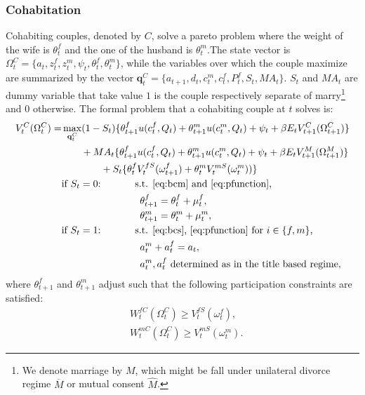 \documentclass[12pt]{article}
\numberwithin{table}{section}
\begin{document}
\subsubsection*{Cohabitation}
Cohabiting couples, denoted by $C$, solve a pareto problem where the weight of the wife is $\theta^f_t$ and the one of the husband is $\theta^m_t$.The state vector is $\Omega^{C}_t=\{a_t,z^f_t,z^m_t,\psi_t,\theta^f_t,\theta^m_t\}$, while the variables over which the couple maximize are summarized by the vector $\mathbf{q}^C_t=\{a_{t+1},d_t,c^m_t,c^f_t,P^f_t,S_t,MA_t\}$. $S_t$ and ${MA}_t$ are dummy variable that take value $1$ is the couple respectively separate of marry\footnote{We denote marriage by $M$, which might be fall under unilateral divorce regime $\overline{M}$ or mutual consent $\hat{M}$.} and 0 otherwise. The formal problem that a cohabiting couple at $t$ solves is:
\begin{equation}\label{eq:v_coh}
\begin{split}
V_t^{C}(\Omega^{C}_t)=&\max_{\mathbf{q}^C_t} (1-S_t)\{\theta^f_{t+1} u(c^f_t,Q_t)+\theta^m_{t+1} u(c^m_t,Q_t)+\psi_t+\beta E_t V^{C}_{t+1}(\Omega^{C}_{t+1})\}
\\ &\quad\quad+MA_t\{\theta^f_{t+1} u(c^f_t,Q_t)+\theta^m_{t+1} u(c^m_t,Q_t)+\psi_t+\beta E_t V^{M}_{t+1}(\Omega^{M}_{t+1})\}\\ &\quad\quad\quad\quad+S_t \{\theta^f_{t}V^{fS}_{t}(\omega^{f}_{t+1})+\theta^m_{t} V^{mS}_{t}(\omega^{m}_{t}))\}
\\ &\text{if $S_t=0$:}\hspace{35pt}\text{s.t. \eqref{eq:bcm} and \eqref{eq:pfunction},}\\ &\hspace{80pt}
\theta^f_{t+1}=\theta^f_{t}+\mu^f_t,\\ &\hspace{80pt}
\theta^m_{t+1}=\theta^m_{t}+\mu^m_t,
\\ &\text{if $S_t=1$:}\hspace{35pt}\text{s.t. \eqref{eq:bcs}, \eqref{eq:pfunction} for $i\in\{f,m\}$,}\\ &
\hspace{80pt}a_t^m+a_t^f= a_t,	\\ &
\hspace{80pt}a_t^m,a_t^f\text{ determined as in the title based regime},
\end{split}
\end{equation}
where $\theta^f_{t+1}$ and $\theta^m_{t+1}$ adjust such that the following participation constraints are satisfied:
\begin{equation}\label{eq:p_cons_coh}
\begin{split}
&
W^{fC}_{t}(\Omega^{C}_{t})\geq V_{t}^{fS}(\omega^f_{t}),\\ &
W^{mC}_{t}(\Omega^{C}_{t})\geq V_{t}^{mS}(\omega^m_{t}). 
\end{split}
\end{equation}
\end{document}
